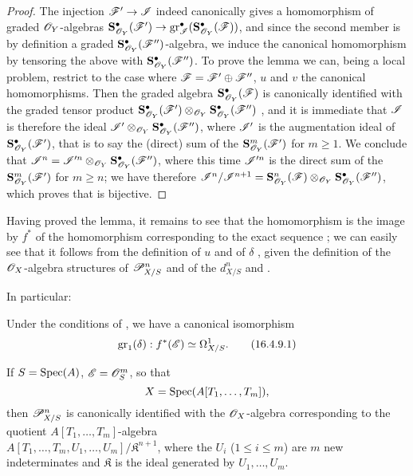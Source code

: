 \begin{proof}
The injection $\sh{F}' \to \sh{I}$ indeed canonically gives a homomorphism of graded $\mathscr{O}_Y$-algebras $\bb{S}_{\sh{O}_Y}^\bullet(\sh{F}') \to \gr_\sh{I}^\bullet(\bb{S}_{\sh{O}_Y}^\bullet(\sh{F}))$, and since the second member is by definition a graded $\mathbf{S}_{\mathscr{O}_Y}^\bullet(\mathscr{F}'')$-algebra, we induce the canonical homomorphism  by tensoring the above with $\mathbf{S}_{\mathscr{O}_Y}^\bullet(\mathscr{F}'')$.
To prove the lemma we can, being a local problem, restrict to the case where $\mathscr{F} = \mathscr{F}' \oplus \mathscr{F}''$, $u$ and $v$ the canonical homomorphisms.
Then the graded algebra $\mathbf{S}_{\mathscr{O}_Y}^\bullet(\mathscr{F})$ is canonically identified with the graded tensor product $\mathbf{S}_{\mathscr{O}_Y}^\bullet(\mathscr{F}') \otimes_{\mathscr{O}_Y} \mathbf{S}_{\mathscr{O}_Y}^\bullet(\mathscr{F}'')$ , and it is immediate that $\mathscr{I}$ is therefore the ideal $\mathscr{I}' \otimes_{\mathscr{O}_Y} \mathbf{S}_{\mathscr{O}_Y}^\bullet(\mathscr{F}'')$, where $\mathscr{I}'$ is the augmentation ideal of $\mathbf{S}_{\mathscr{O}_Y}^\bullet(\mathscr{F}')$, that is to say the (direct) sum of the $\mathbf{S}_{\mathscr{O}_Y}^m(\mathscr{F}')$ for $m \geq 1$.
We conclude that $\mathscr{I}^n = \mathscr{I}'^n \otimes_{\mathscr{O}_Y} \mathbf{S}_{\mathscr{O}_Y}^\bullet(\mathscr{F}'')$, where this time $\mathscr{I}'^n$ is the direct sum of the $\mathbf{S}_{\mathscr{O}_Y}^m(\mathscr{F}')$ for $m \geq n$;
we have therefore $\mathscr{I}^n/\mathscr{I}^{n+1} = \mathbf{S}_{\mathscr{O}_Y}^n(\mathscr{F}) \otimes_{\mathscr{O}_Y} \mathbf{S}_{\mathscr{O}_Y}^\bullet(\mathscr{F}'')$, which proves that  is bijective.
\end{proof}

Having proved the lemma, it remains to see that the homomorphism  is the image by $f^*$ of the homomorphism  corresponding to the exact sequence ;
we can easily see that it follows from the definition of $u$  and of $\delta$ , given the definition of the $\mathscr{O}_X$-algebra structures of $\mathscr{P}_{X/S}^n$ and of the $d_{X/S}^n$  and .

In particular:

\begin{corollary}[16.4.9]
\label{IV.16.4.9}
Under the conditions of , we have a canonical isomorphism
\[
\label{IV.16.4.9.1}
  \operatorname{gr}_1(\delta): f^*(\mathscr{E}) \simeq \Omega_{X/S}^1.
  \tag{16.4.9.1}
\]
\end{corollary}

\begin{corollary}[16.4.10]
\label{IV.16.4.10}
If $S = \operatorname{Spec}(A)$, $\mathscr{E} = \mathscr{O}_S^m$, so that
\[
  X = \operatorname{Spec}(A[T_1, \dots, T_m]),
\]
then $\mathscr{P}_{X/S}^n$ is canonically identified with the $\mathscr{O}_X$-algebra corresponding to the quotient $A[T_1, \dots, T_m]$-algebra\\
$A[T_1, \dots, T_m, U_1, \dots, U_m]/\mathfrak{K}^{n+1}$, where the $U_i$ ($1 \leq i \leq m$) are $m$ new indeterminates and $\mathfrak{K}$ is the ideal generated by $U_1, \dots, U_m$.
\end{corollary}

